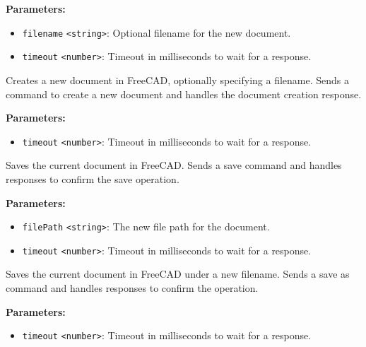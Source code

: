 \documentclass[12pt,a4paper]{article}
\begin{document}
\noindent \textbf{Parameters:}
\begin{itemize}
  \item \texttt{filename} \texttt{<string>}: Optional filename for the new document.
  \item \texttt{timeout} \texttt{<number>}: Timeout in milliseconds to wait for a response.
\end{itemize}

\noindent Creates a new document in FreeCAD, optionally specifying a filename.
Sends a command to create a new document and handles the document creation response.

\vspace{5mm}
\noindent {}


\noindent \textbf{Parameters:}
\begin{itemize}
  \item \texttt{timeout} \texttt{<number>}: Timeout in milliseconds to wait for a response.
\end{itemize}

\noindent Saves the current document in FreeCAD.
Sends a save command and handles responses to confirm the save operation.

\vspace{5mm}
\noindent {}


\noindent \textbf{Parameters:}
\begin{itemize}
  \item \texttt{filePath} \texttt{<string>}: The new file path for the document.
  \item \texttt{timeout} \texttt{<number>}: Timeout in milliseconds to wait for a response.
\end{itemize}

\noindent Saves the current document in FreeCAD under a new filename.
Sends a save as command and handles responses to confirm the operation.

\vspace{5mm}
\noindent {}


\noindent \textbf{Parameters:}
\begin{itemize}
  \item \texttt{timeout} \texttt{<number>}: Timeout in milliseconds to wait for a response.
\end{itemize}
\end{document}
